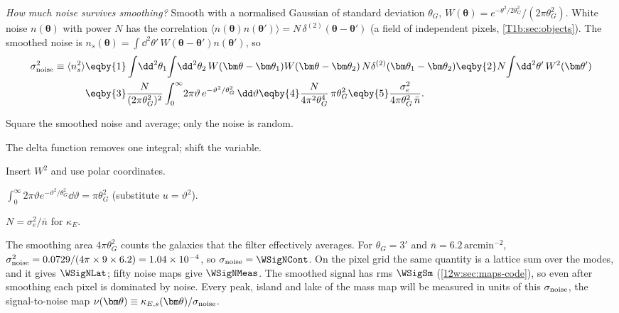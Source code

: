 \emph{How much noise survives smoothing?} Smooth with a normalised Gaussian of standard deviation $\theta_G$,
$W(\bm\theta)=e^{-\theta^2/2\theta_G^2}/(2\pi\theta_G^2)$. White noise $n(\bm\theta)$ with power $N$ has the
correlation $\langle n(\bm\theta)n(\bm\theta')\rangle=N\,\delta^{(2)}(\bm\theta-\bm\theta')$ (a field of independent
pixels, \cref{T1b:sec:objects}). The smoothed noise is $n_s(\bm\theta)=\int\dd^2\theta'\,W(\bm\theta-\bm\theta')
n(\bm\theta')$, so
\begin{align}
\sigma_{\rm noise}^2\equiv\langle n_s^2\rangle
&\eqby{1}\int\!\dd^2\theta_1\!\int\!\dd^2\theta_2\,W(\bm\theta-\bm\theta_1)W(\bm\theta-\bm\theta_2)\,
N\delta^{(2)}(\bm\theta_1-\bm\theta_2)
\eqby{2}N\!\int\!\dd^2\theta'\,W^2(\bm\theta')
\nonumber\\
&\eqby{3}\frac{N}{(2\pi\theta_G^2)^2}\int_0^\infty\!2\pi\vartheta\,e^{-\vartheta^2/\theta_G^2}\,\dd\vartheta
\eqby{4}\frac{N}{4\pi^2\theta_G^4}\,\pi\theta_G^2
\eqby{5}\frac{\sigma_e^2}{4\pi\theta_G^2\,\bar n}.
\label{12w:eq:sigma-noise}
\end{align}
\begin{explain}
  \item Square the smoothed noise and average; only the noise is random.
  \item The delta function removes one integral; shift the variable.
  \item Insert $W^2$ and use polar coordinates.
  \item $\int_0^\infty2\pi\vartheta e^{-\vartheta^2/\theta_G^2}\dd\vartheta=\pi\theta_G^2$ (substitute $u=\vartheta^2$).
  \item $N=\sigma_e^2/\bar n$ for $\kappa_E$.
\end{explain}
The smoothing area $4\pi\theta_G^2$ counts the galaxies that the filter effectively averages. For $\theta_G=3'$
and $\bar n=6.2\,\mathrm{arcmin}^{-2}$, $\sigma_{\rm noise}^2=0.0729/(4\pi\times9\times6.2)=1.04\times10^{-4}$, so
$\sigma_{\rm noise}=\WSigNCont$. On the pixel grid the same quantity is a lattice sum over the modes, and it gives
$\WSigNLat$; fifty noise maps give $\WSigNMeas$. The smoothed signal has rms $\WSigSm$
(\cref{12w:sec:maps-code}), so even after smoothing each pixel is dominated by noise. Every peak, island and lake of
the mass map will be measured in units of this $\sigma_{\rm noise}$, the signal-to-noise map
$\nu(\bm\theta)\equiv\kappa_{E,s}(\bm\theta)/\sigma_{\rm noise}$.

